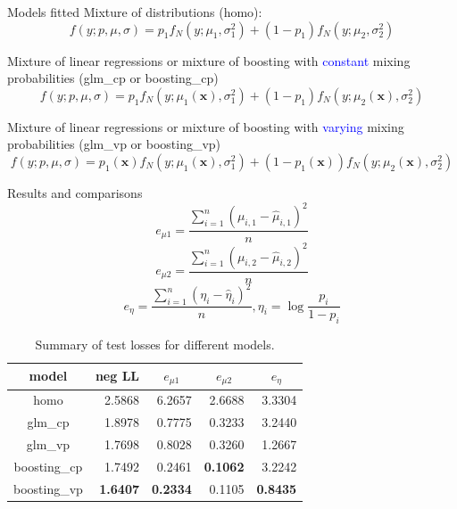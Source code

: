 \documentclass[professionalfont]{beamer}
\def\bx{\boldsymbol{x}}
\newcommand{\blue}[1]{\textcolor{blue}{#1}}
\begin{document}
\begin{frame}{Models fitted}
Mixture of distributions (homo):
$$f(y;p,\mu,\sigma)=p_1f_N(y;\mu_1,\sigma_1^2)+(1-p_1)f_N(y;\mu_2,\sigma_2^2)$$

Mixture of linear regressions or mixture of boosting with \blue{constant} mixing probabilities (glm\_cp or boosting\_cp)
$$f(y;p,\mu,\sigma)=p_1f_N(y;\mu_1(\bx),\sigma_1^2)+(1-p_1)f_N(y;\mu_2(\bx),\sigma_2^2)$$

Mixture of linear regressions or mixture of boosting with \blue{varying} mixing probabilities (glm\_vp or boosting\_vp)
$$f(y;p,\mu,\sigma)=p_1(\bx)f_N(y;\mu_1(\bx),\sigma_1^2)+(1-p_1(\bx))f_N(y;\mu_2(\bx),\sigma_2^2)$$
\end{frame}
\begin{frame}{Results and comparisons}
	$$e_{\mu 1}=\frac{\sum_{i=1}^{n}(\mu_{i,1}-\hat{\mu}_{i,1})^2}{n}$$
	$$e_{\mu 2}=\frac{\sum_{i=1}^{n}(\mu_{i,2}-\hat{\mu}_{i,2})^2}{n}$$
	$$e_{\eta}=\frac{\sum_{i=1}^{n}(\eta_{i}-\hat{\eta}_{i})^2}{n}, \eta_i=\log\frac{p_i}{1-p_i}$$
\begin{table}[htp!]
	\centering
	\caption{Summary of test losses for different models.}\label{gaussian-summary}
	\begin{tabular}{c|rrrr}
		\hline
		model        & \multicolumn{1}{c}{neg LL} & \multicolumn{1}{c}{$e_{\mu 1}$} & \multicolumn{1}{c}{$e_{\mu 2}$} & \multicolumn{1}{c}{$e_{\eta}$} \\ \hline
		homo         & 2.5868                   & 6.2657                         & 2.6688                        & 3.3304                             \\
		glm\_cp      & 1.8978                   & 0.7775                         & 0.3233                         & 3.2440                             \\
		glm\_vp      & 1.7698                   & 0.8028                         & 0.3260                         & 1.2667                             \\
		boosting\_cp & 1.7492                   & 0.2461                         & {\bf 0.1062}                        & 3.2242                             \\
		boosting\_vp & {\bf 1.6407}                  & {\bf 0.2334}                         & 0.1105                         & {\bf 0.8435}                             \\ \hline
	\end{tabular}
\end{table}
\end{frame}
\end{document}
